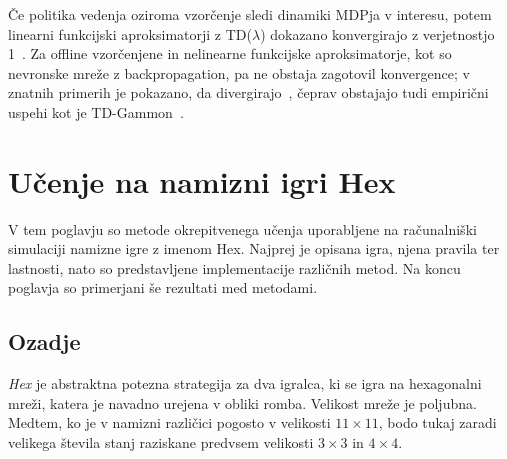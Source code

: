 \documentclass[a4paper, oneside, 12pt]{report}
\begin{document}
Če politika vedenja oziroma vzorčenje sledi dinamiki MDPja v interesu, potem linearni funkcijski aproksimatorji z TD($\lambda$) dokazano konvergirajo z verjetnostjo 1~\cite{AnAnalysisOfTemporalDifferenceLearningWithFunctionApproximation}. Za offline vzorčenjene in nelinearne funkcijske aproksimatorje, kot so nevronske mreže z backpropagation, pa ne obstaja zagotovil konvergence; v znatnih primerih je pokazano, da divergirajo~\cite{GeneralizationInReinforcementLearningSafelyApproximatingTheValueFunction}, čeprav obstajajo tudi empirični uspehi kot je TD-Gammon~\cite{PracticalIssuesInTemporalDifferenceLearning}.

\chapter{Učenje na namizni igri Hex} \label{chapter:Hex}
V tem poglavju so metode okrepitvenega učenja uporabljene na računalniški simulaciji namizne igre z imenom Hex. Najprej je opisana igra, njena pravila ter lastnosti, nato so predstavljene implementacije različnih metod. Na koncu poglavja so primerjani še rezultati med metodami.

\thispagestyle{fancy}
\section{Ozadje}
{\em Hex} je abstraktna potezna strategija za dva igralca, ki se igra na hexagonalni mreži, katera je navadno urejena v obliki romba. Velikost mreže je poljubna. Medtem, ko je v namizni različici pogosto v velikosti $11 \times 11$, bodo tukaj zaradi velikega števila stanj raziskane predvsem velikosti $3 \times 3$ in $4 \times 4$.
\end{document}
